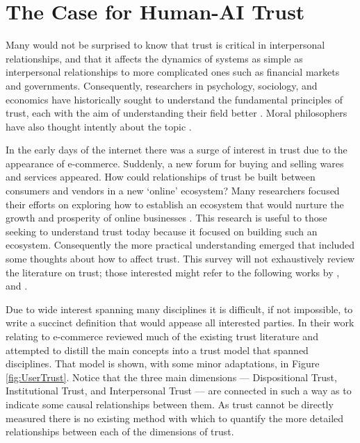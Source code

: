\section{The Case for Human-AI Trust}
    Many would not be surprised to know that trust is critical in interpersonal relationships, and that it affects the dynamics of systems as simple as interpersonal relationships to more complicated ones such as financial markets \cite{Fukuyama1995-un} and governments. Consequently, researchers in psychology, sociology, and economics have historically sought to understand the fundamental principles of trust, each with the aim of understanding their field better \cite{Gambetta1988-pi}. Moral philosophers have also thought intently about the topic \cite{Baier1986-im}.

    In the early days of the internet there was a surge of interest in trust due to the appearance of e-commerce. Suddenly, a new forum for buying and selling wares and services appeared. How could relationships of trust be built between consumers and vendors in a new `online' ecosystem? Many researchers focused their efforts on exploring how to establish an ecosystem that would nurture the growth and prosperity of online businesses \cite{McKnight2001-fa}. This research is useful to those seeking to understand trust today because it focused on building such an ecosystem. Consequently the more practical understanding emerged that included some thoughts about how to affect trust. This survey will not exhaustively review the literature on trust; those interested might refer to the following works by \citet{McKnight2001-fa}, and \citet{Lewicki2006-hj}.

    Due to wide interest spanning many disciplines it is difficult, if not impossible, to write a succinct definition that would appease all interested parties. In their work relating to e-commerce \citet{McKnight2001-fa} reviewed much of the existing trust literature and attempted to distill the main concepts into a trust model that spanned disciplines. That model is shown, with some minor adaptations, in Figure \ref{fig:UserTrust}. Notice that the three main dimensions --- Dispositional Trust, Institutional Trust, and Interpersonal Trust --- are connected in such a way as to indicate some causal relationships between them. As trust cannot be directly measured there is no existing method with which to quantify the more detailed relationships between each of the dimensions of trust.


